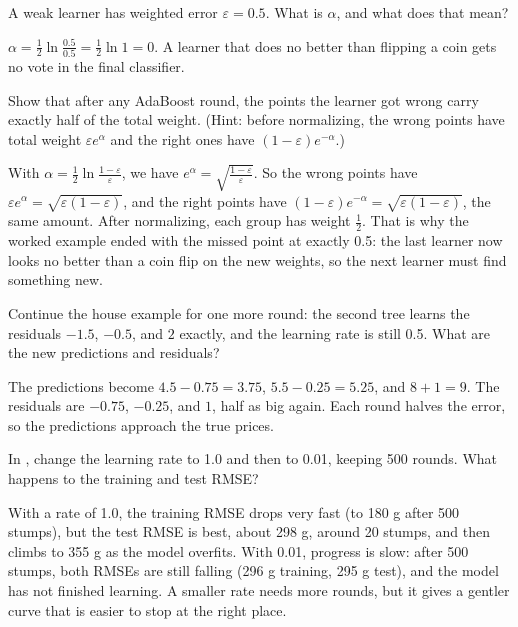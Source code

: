 \begin{Exercise}[label=bst3, title=A coin-flip learner]
A weak learner has weighted error $\varepsilon = 0.5$. What is $\alpha$, and what does that mean?
\end{Exercise}
\begin{Answer}[ref=bst3]
$\alpha = \frac{1}{2}\ln\frac{0.5}{0.5} = \frac{1}{2}\ln 1 = 0$. A learner that does no better than flipping a coin
gets no vote in the final classifier.
\end{Answer}

\begin{Exercise}[label=bst4, title={Half the weight}, space=3cm]
Show that after any AdaBoost round, the points the learner got wrong carry exactly half of the total weight.
(Hint: before normalizing, the wrong points have total weight $\varepsilon e^{\alpha}$ and the right ones have
$(1 - \varepsilon)e^{-\alpha}$.)
\end{Exercise}
\begin{Answer}[ref=bst4]
With $\alpha = \frac{1}{2}\ln\frac{1 - \varepsilon}{\varepsilon}$, we have $e^{\alpha} =
\sqrt{\frac{1 - \varepsilon}{\varepsilon}}$. So the wrong points have $\varepsilon e^{\alpha} =
\sqrt{\varepsilon(1 - \varepsilon)}$, and the right points have $(1 - \varepsilon)e^{-\alpha} =
\sqrt{\varepsilon(1 - \varepsilon)}$, the same amount. After normalizing, each group has weight $\frac{1}{2}$. That is
why the worked example ended with the missed point at exactly 0.5: the last learner now looks no better than a
coin flip on the new weights, so the next learner must find something new.
\end{Answer}

\begin{Exercise}[label=bst5, title={A second round}, space=3cm]
Continue the house example for one more round: the second tree learns the residuals $-1.5$, $-0.5$, and $2$
exactly, and the learning rate is still 0.5. What are the new predictions and residuals?
\end{Exercise}
\begin{Answer}[ref=bst5]
The predictions become $4.5 - 0.75 = 3.75$, $5.5 - 0.25 = 5.25$, and $8 + 1 = 9$. The residuals are $-0.75$, $-0.25$,
and $1$, half as big again. Each round halves the error, so the predictions approach the true prices.
\end{Answer}

\begin{Exercise}[label=bst6, title={Learning rate}]
In , change the learning rate to 1.0 and then to 0.01, keeping 500 rounds. What happens
to the training and test RMSE?
\end{Exercise}
\begin{Answer}[ref=bst6]
With a rate of 1.0, the training RMSE drops very fast (to 180 g after 500 stumps), but the test RMSE is best,
about 298 g, around 20 stumps, and then climbs to 355 g as the model overfits. With 0.01, progress is slow: after
500 stumps, both RMSEs are still falling (296 g training, 295 g test), and the model has not finished learning. A smaller rate needs more rounds, but it gives a gentler
curve that is easier to stop at the right place.
\end{Answer}
